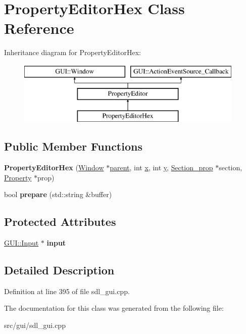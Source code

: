 \hypertarget{classPropertyEditorHex}{\section{Property\-Editor\-Hex Class Reference}
\label{classPropertyEditorHex}
}
Inheritance diagram for Property\-Editor\-Hex\-:\begin{figure}[H]
\begin{center}
\leavevmode
\includegraphics[height=3.000000cm]{classPropertyEditorHex}
\end{center}
\end{figure}
\subsection*{Public Member Functions}
\begin{DoxyCompactItemize}
\item 
\hypertarget{classPropertyEditorHex_a7a21b5b6314a5dcdc29d255ff231e84c}{{\bfseries Property\-Editor\-Hex} (\hyperlink{classGUI_1_1Window_ae828e9daa964dfc65a3550fb03117d30}{Window} $\ast$\hyperlink{classGUI_1_1Window_a2e593ff65e7702178d82fe9010a0b539}{parent}, int \hyperlink{classGUI_1_1Window_a6ca6a80ca00c9e1d8ceea8d3d99a657d}{x}, int \hyperlink{classGUI_1_1Window_a0ee8e923aff2c3661fc2e17656d37adf}{y}, \hyperlink{classSection__prop}{Section\-\_\-prop} $\ast$section, \hyperlink{classProperty}{Property} $\ast$prop)}\label{classPropertyEditorHex_a7a21b5b6314a5dcdc29d255ff231e84c}

\item 
\hypertarget{classPropertyEditorHex_aae67d8ec3c95b536a6fc01c40e5541e9}{bool {\bfseries prepare} (std\-::string \&buffer)}\label{classPropertyEditorHex_aae67d8ec3c95b536a6fc01c40e5541e9}

\end{DoxyCompactItemize}
\subsection*{Protected Attributes}
\begin{DoxyCompactItemize}
\item 
\hypertarget{classPropertyEditorHex_ae4aaff687f15bb4ca498899dcd1d1812}{\hyperlink{classGUI_1_1Input}{G\-U\-I\-::\-Input} $\ast$ {\bfseries input}}\label{classPropertyEditorHex_ae4aaff687f15bb4ca498899dcd1d1812}

\end{DoxyCompactItemize}


\subsection{Detailed Description}


Definition at line 395 of file sdl\-\_\-gui.\-cpp.



The documentation for this class was generated from the following file\-:\begin{DoxyCompactItemize}
\item 
src/gui/sdl\-\_\-gui.\-cpp\end{DoxyCompactItemize}
